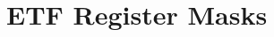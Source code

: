 \hypertarget{group___e_t_f___register___masks}{}\section{E\+T\+F Register Masks}
\label{group___e_t_f___register___masks}
